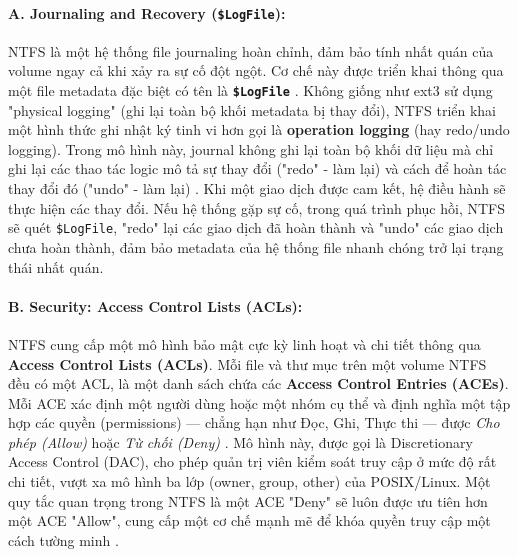 \documentclass[12pt]{article}
\begin{document}
\paragraph{A. Journaling and Recovery (\texttt{\$LogFile}):}
NTFS là một hệ thống file journaling hoàn chỉnh, đảm bảo tính nhất quán của volume ngay cả khi xảy ra sự cố đột ngột. Cơ chế này được triển khai thông qua một file metadata đặc biệt có tên là \textbf{\texttt{\$LogFile}} \parencite{Shafiei2012}. Không giống như ext3 sử dụng "physical logging" (ghi lại toàn bộ khối metadata bị thay đổi), NTFS triển khai một hình thức ghi nhật ký tinh vi hơn gọi là \textbf{operation logging} (hay redo/undo logging). Trong mô hình này, journal không ghi lại toàn bộ khối dữ liệu mà chỉ ghi lại các thao tác logic mô tả sự thay đổi ("redo" - làm lại) và cách để hoàn tác thay đổi đó ("undo" - làm lại) \parencite{HarvardCS161Journaling}. Khi một giao dịch được cam kết, hệ điều hành sẽ thực hiện các thay đổi. Nếu hệ thống gặp sự cố, trong quá trình phục hồi, NTFS sẽ quét \texttt{\$LogFile}, "redo" lại các giao dịch đã hoàn thành và "undo" các giao dịch chưa hoàn thành, đảm bảo metadata của hệ thống file nhanh chóng trở lại trạng thái nhất quán.

\paragraph{B. Security: Access Control Lists (ACLs):}
NTFS cung cấp một mô hình bảo mật cực kỳ linh hoạt và chi tiết thông qua \textbf{Access Control Lists (ACLs)}. Mỗi file và thư mục trên một volume NTFS đều có một ACL, là một danh sách chứa các \textbf{Access Control Entries (ACEs)}. Mỗi ACE xác định một người dùng hoặc một nhóm cụ thể và định nghĩa một tập hợp các quyền (permissions) --- chẳng hạn như Đọc, Ghi, Thực thi --- được \textit{Cho phép (Allow)} hoặc \textit{Từ chối (Deny)} \parencite{SettingAccessControlLists}. Mô hình này, được gọi là Discretionary Access Control (DAC), cho phép quản trị viên kiểm soát truy cập ở mức độ rất chi tiết, vượt xa mô hình ba lớp (owner, group, other) của POSIX/Linux. Một quy tắc quan trọng trong NTFS là một ACE "Deny" sẽ luôn được ưu tiên hơn một ACE "Allow", cung cấp một cơ chế mạnh mẽ để khóa quyền truy cập một cách tường minh \parencite{Allison1998}.
\end{document}
